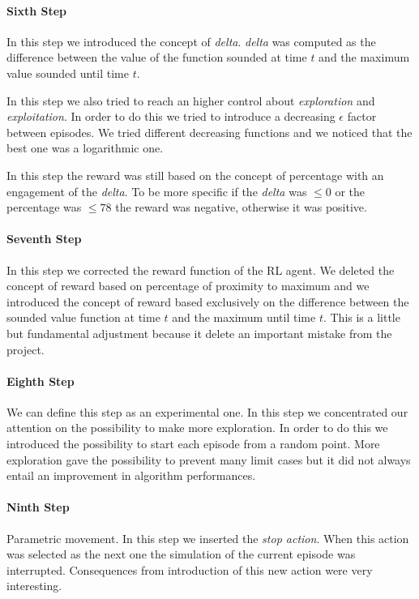 \paragraph{Sixth Step} In this step we introduced the concept of \textit{delta}. \textit{delta} was computed as the difference between the value of the function sounded at time $t$ and the maximum value sounded until time $t$. 

In this step we also tried to reach an higher control about \textit{exploration} and \textit{exploitation}. In order to do this we tried to introduce a decreasing $\epsilon$ factor between episodes. We tried different decreasing functions and we noticed that the best one was a logarithmic one. 

In this step the reward was still based on the concept of percentage with an engagement of the \textit{delta}. To be more specific if the \textit{delta} was $\le 0$ or the percentage was $\le 78$ the reward was negative, otherwise it was positive.

\paragraph{Seventh Step} In this step we corrected the reward function of the RL agent. We deleted the concept of reward based on percentage of proximity to maximum and we introduced the concept of reward based exclusively on the difference between the sounded value function at time $t$ and the maximum until time $t$. This is a little but fundamental adjustment because it delete an important mistake from the project.

\paragraph{Eighth Step} We can define this step as an experimental one. In this step we concentrated our attention on the possibility to make more exploration. In order to do this we introduced the possibility to start each episode from a random point. More exploration gave the possibility to prevent many limit cases but it did not always entail an improvement in algorithm performances.

\paragraph{Ninth Step} Parametric movement. In this step we inserted the \textit{stop action}. When this action was selected as the next one the simulation of the current episode was interrupted. Consequences from introduction of this new action were very interesting.

